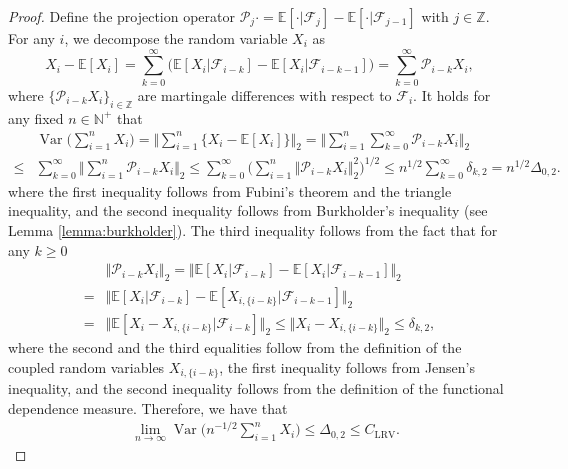 \documentclass[11pt]{article}
\DeclareMathOperator*{\var}{Var}
\theoremstyle{plain}
\theoremstyle{definition}
\begin{document}
\begin{proof}
    Define the projection operator $\mathcal{P}_j\cdot = \mathbb{E}[\cdot|\mathcal{F}_j] - \mathbb{E}[\cdot| \mathcal{F}_{j-1}]$ with $j \in \mathbb{Z}$. For any $i$, we decompose the random variable $X_i$ as
    \begin{equation*}
        X_i - \mathbb{E}[X_i] = \sum_{k = 0}^{\infty}\big(\mathbb{E}[X_i|\mathcal{F}_{i-k}] - \mathbb{E}[X_i| \mathcal{F}_{i-k-1}]\big) = \sum_{k = 0}^{\infty}\mathcal{P}_{i-k}X_i,
    \end{equation*}
    where $\{\mathcal{P}_{i-k}X_i\}_{i \in \mathbb{Z}}$ are martingale differences with respect to $\mathcal{F}_i$.
    It holds for any fixed $n \in \mathbb{N}^+$ that 
    \begin{equation*}
    \begin{aligned}
        &\var\Big(\sum_{i = 1}^n X_i\Big) = \Big\Vert \sum_{i=1}^n\{X_i - \mathbb{E}[X_i]\} \Big\Vert_2 = \Big\Vert \sum_{i=1}^n\sum_{k = 0}^{\infty}\mathcal{P}_{i-k}X_i \Big\Vert_2\\
        \leq& \sum_{k = 0}^{\infty}\Big\Vert \sum_{i=1}^n\mathcal{P}_{i-k}X_i \Big\Vert_2 \leq \sum_{k = 0}^{\infty}\Big( \sum_{i=1}^n\Vert \mathcal{P}_{i-k}X_i \Vert_2^2\Big)^{1/2} \leq n^{1/2}\sum_{k = 0}^{\infty}\delta_{k,2} = n^{1/2}\Delta_{0,2}.
    \end{aligned}
    \end{equation*}
    where the first inequality follows from Fubini's theorem and the triangle inequality, and the second inequality follows from Burkholder's inequality (see Lemma \ref{lemma:burkholder}). The third inequality follows from the fact that for any $k \geq 0$
    \begin{equation*}
    \begin{aligned}
        &\Vert \mathcal{P}_{i-k}X_i \Vert_2 = \Vert \mathbb{E}[X_i | \mathcal{F}_{i-k}] -\mathbb{E}[X_i | \mathcal{F}_{i-k-1}] \Vert_2\\
        =& \Vert\mathbb{E}[X_i| \mathcal{F}_{i-k}] - \mathbb{E}[X_{i,\{i-k\}}| \mathcal{F}_{i-k-1}]\Vert_2\\
        =& \Vert\mathbb{E}[X_i-X_{i,\{i-k\}}| \mathcal{F}_{i-k}]\Vert_2 \leq \Vert X_{i}-X_{i,\{i-k\}}\Vert_2 \leq \delta_{k,2},
    \end{aligned}
    \end{equation*}
    where the second and the third equalities follow from the definition of the coupled random variables $X_{i,\{i-k\}}$, the first inequality follows from Jensen's inequality, and the second inequality follows from the definition of the functional dependence measure.
Therefore, we have that
\begin{equation}\label{eq:LRV_univariate_ub}
\begin{aligned}
    &\lim_{n \to \infty}\var\Big(n^{-1/2}\sum_{i = 1}^n X_i\Big) \leq \Delta_{0,2} \leq C_{\mathrm{LRV}}.
\end{aligned}
\end{equation}
\end{proof}
\fi
\end{document}
